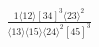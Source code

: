 \documentclass[varwidth, border=5pt]{standalone}
\begin{document}
\begin{my}
$\begin{gathered}
\scriptscriptstyle\frac{1⟨12⟩[34]^3⟨23⟩^2}{⟨13⟩⟨15⟩⟨24⟩^2[45]^3}
\end{gathered}$
\end{my}
\end{document}
